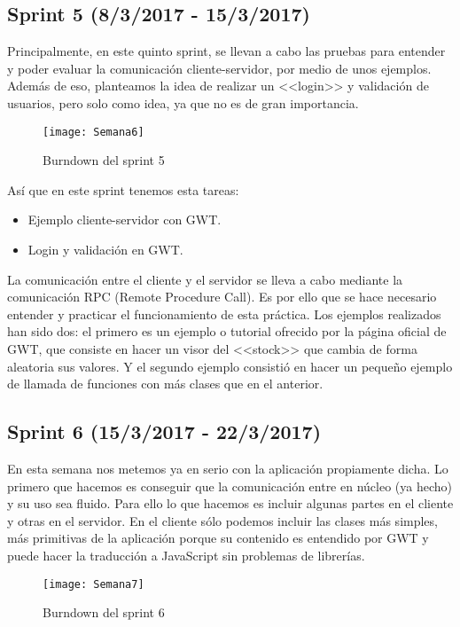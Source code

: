 \subsection{Sprint 5 (8/3/2017 - 15/3/2017)}

Principalmente, en este quinto sprint, se llevan a cabo las pruebas para entender y poder evaluar la comunicación cliente-servidor, por medio de unos ejemplos. Además de eso, planteamos la idea de realizar un <<login>> y validación de usuarios, pero solo como idea, ya que no es de gran importancia.

\begin{figure}[h]
\centering
\texttt{[image: Semana6]}
\caption{Burndown del sprint 5}
\label{fig:A.4}
\end{figure}


Así que en este sprint tenemos esta tareas:

\begin{itemize}
\item Ejemplo cliente-servidor con GWT.
\item Login y validación en GWT.
\end{itemize}

La comunicación entre el cliente y el servidor se lleva a cabo mediante la comunicación RPC (Remote Procedure Call). Es por ello que se hace necesario entender y practicar el funcionamiento de esta práctica. Los ejemplos realizados han sido dos: el primero es un ejemplo o tutorial ofrecido por la página oficial de GWT, que consiste en hacer un visor del <<stock>> que cambia de forma aleatoria sus valores. Y el segundo ejemplo consistió en hacer un pequeño ejemplo de llamada de funciones con más clases que en el anterior.


\subsection{Sprint 6 (15/3/2017 - 22/3/2017)}

En esta semana nos metemos ya en serio con la aplicación propiamente dicha. Lo primero que hacemos es conseguir que la comunicación entre en núcleo (ya hecho) y su uso sea fluido. Para ello lo que hacemos es incluir algunas partes en el cliente y otras en el servidor. En el cliente sólo podemos incluir las clases más simples, más primitivas de la aplicación porque su contenido es entendido por GWT y puede hacer la traducción a JavaScript sin problemas de librerías.

\begin{figure}[h]
\centering
\texttt{[image: Semana7]}
\caption{Burndown del sprint 6}
\label{fig:A.5}
\end{figure}

